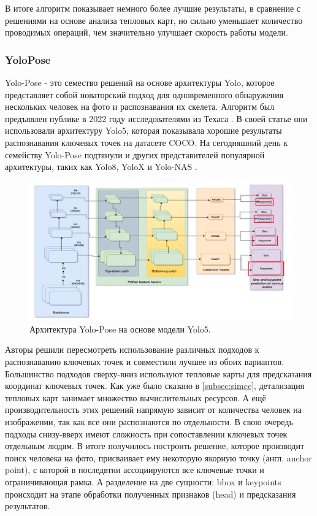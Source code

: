 В итоге алгоритм показывает немного более лучшие результаты, в сравнение с решениями на основе анализа тепловых карт, но сильно уменьшает количество проводимых операций, чем значительно улучшает скорость работы модели.

\subsubsection*{YoloPose}

Yolo-Pose - это семество решений на основе архитектуры Yolo, которое представляет собой новаторский подход для одновременного обнаружения нескольких человек на фото и распознавания их скелета. Алгоритм был предъявлен публике в 2022 году исследователями из Техаса \cite{yolo_pose}. В своей статье они использовали архитектуру Yolo5, которая показывала хорошие результаты распознавания ключевых точек на датасете COCO. На сегодняшний день к семейству Yolo-Pose подтянули и других представителей популярной архитектуры, таких как Yolo8, YoloX и Yolo-NAS \cite{yolo8, yolox}.

\begin{figure}[h]
	\centering
	\includegraphics[width=\textwidth]{./images/yolo_pose}
	\caption{Архитектура Yolo-Pose на основе модели Yolo5. \cite{yolo_pose}}
	\label{fig:yolo_pose}
\end{figure}

Авторы решили пересмотреть использование различных подходов к распознаванию ключевых точек и совместили лучшее из обоих вариантов. Большинство подходов сверху-вниз используют тепловые карты для предсказания координат ключевых точек. Как уже было сказано в \autoref{subsec:simcc}, детализация тепловых карт занимает множество вычислительных ресурсов. А ещё производительность этих решений напрямую зависит от количества человек на изображении, так как все они распознаются по отдельности. В свою очередь подходы снизу-вверх имеют сложность при сопоставлении ключевых точек отдельным людям. В итоге получилось построить решение, которое производит поиск человека на фото, присваивает ему некоторую якорную точку (англ. anchor point), с которой в последвтии ассоциируются все ключевые точки и ограничивающая рамка. А разделение на две сущности: bbox и keypoints происходит на этапе обработки полученных признаков (head) и предсказания результатов.

